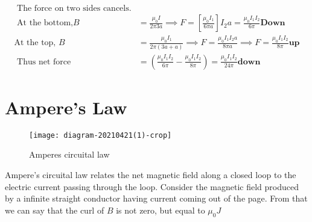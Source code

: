 \begin{answer}
	\begin{align*}
\text{	The force on two sides cancels.}\\
\text{	At the bottom,}B&=\frac{\mu_{0} I}{2\pi 3a} \implies F=\left[ \frac{\mu_{0} I_1}{6\pi a}\right] 	I_2a=\frac{\mu_{0} I_1I_2}{6\pi} \textbf{Down}\\
	\text{At the top, }B&=\frac{\mu_{0}I_1}{2\pi(3a+a)}\implies F=\frac{\mu_{0}I_1I_2a}{8\pi a}\implies F=\frac{\mu_{0}I_1I_2}{8\pi} \textbf{up}\\
\text{	Thus net force}&=\left( \frac{\mu_{0}I_1I_2}{6\pi}-\frac{\mu_{0}I_1I_2}{8\pi}\right) =\frac{\mu_{0}I_1I_2}{24\pi}\textbf{down}
	\end{align*}
\end{answer}
\section{Ampere's Law}
 \begin{wrapfigure}{r}{0.35\textwidth}
	\begin{center}
		\texttt{[image: diagram-20210421(1)-crop]}
	\end{center}
	\caption{Amperes circuital law}
\end{wrapfigure}
Ampere's circuital law relates the net magnetic field along a closed loop to the electric current passing through the loop.
Consider the magnetic field produced by a infinite straight conductor having current coming out of the page. From that we can say that the curl of $B$ is not zero, but equal to $\mu_0J$

